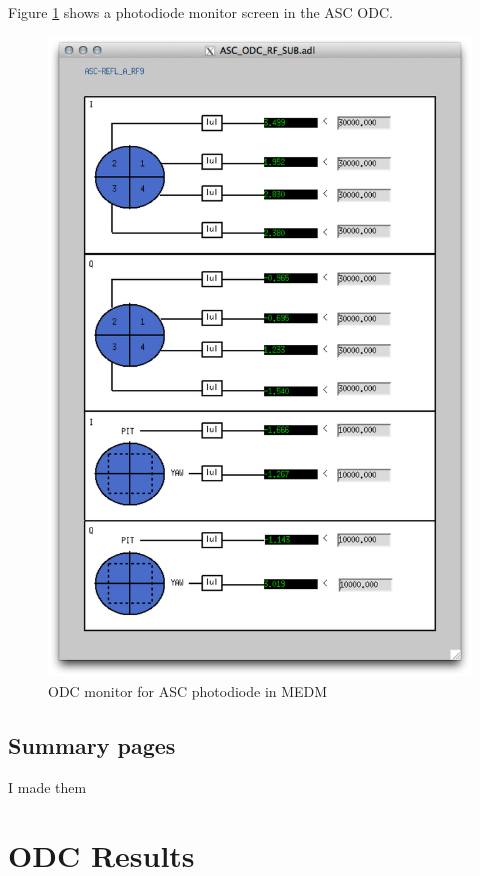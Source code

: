 Figure \ref{fig:odc-pd-screen} shows a photodiode monitor screen in the ASC ODC. 

\begin{figure}[ht!]
\includegraphics[width=\textwidth]{figures/ODC/PD_screen}
\caption[ASC ODC Photodiode Monitor in MEDM]{ODC monitor for ASC photodiode in MEDM}
\label{fig:odc-pd-screen}
\end{figure}

\subsection{Summary pages}
I made them

\section{ODC Results}

